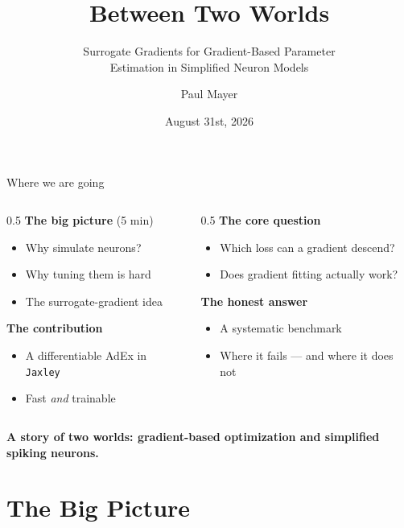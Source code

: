 \documentclass[17pt, t, lualatex]{beamer}
\title{Between Two Worlds}
\subtitle{\large Surrogate Gradients for Gradient-Based Parameter\\Estimation in Simplified Neuron Models}
\date{August 31st, 2026}
\institute[KTH]{KTH Royal Institute of Technology}
\author{Paul Mayer}
\newcommand{\good}[1]{{\color{dark green}#1}}
\newcommand{\bad}[1]{{\color{dark brick}#1}}
\newcommand{\takeaway}[1]{%
  \vfill
  {\centering\usebeamercolor[fg]{structure}%
   \small\textbf{#1}\par}%
  \vspace{2pt}%
}
\begin{document}
\inserttitlepage

\begin{frame}{Where we are going}
\begin{columns}[T]
\begin{column}{0.5\textwidth}
\textbf{The big picture} \good{(5 min)}
\begin{itemize}
  \item Why simulate neurons?
  \item Why tuning them is hard
  \item The surrogate-gradient idea
\end{itemize}
\vspace{0.3cm}
\textbf{The contribution}
\begin{itemize}
  \item A differentiable AdEx in \texttt{Jaxley}
  \item Fast \emph{and} trainable
\end{itemize}
\end{column}
\begin{column}{0.5\textwidth}
\textbf{The core question}
\begin{itemize}
  \item Which loss can a gradient descend?
  \item Does gradient fitting actually work?
\end{itemize}
\vspace{0.3cm}
\textbf{The honest answer}
\begin{itemize}
  \item A systematic benchmark
  \item \bad{Where it fails} --- and \good{where it does not}
\end{itemize}
\end{column}
\end{columns}
\takeaway{A story of two worlds: gradient-based optimization and simplified spiking neurons.}
\end{frame}

\section{The Big Picture}
\insertsectionpage
\end{document}
